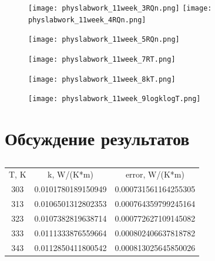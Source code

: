 \documentclass[a4paper,12pt]{article} %
\begin{document}
\begin{figure}[h!]
\begin{floatrow}
         {\texttt{[image: physlabwork\_11week\_3RQn.png]}}
         {\texttt{[image: physlabwork\_11week\_4RQn.png]}}         
\end{floatrow}
\end{figure}

\begin{figure}[h!]
\begin{floatrow}
         {\texttt{[image: physlabwork\_11week\_5RQn.png]}}     
\end{floatrow}
\end{figure}
\restoregeometry

\begin{figure}[h!]
\begin{floatrow}
 \ffigbox[\FBwidth]{\caption{}\label{fig:Graph_5}}%
         {\texttt{[image: physlabwork\_11week\_7RT.png]}}     
\end{floatrow}
\end{figure}

\begin{figure}[h!]
\begin{floatrow}
 \ffigbox[\FBwidth]{\caption{}\label{fig:Graph_5}}%
         {\texttt{[image: physlabwork\_11week\_8kT.png]}}     
\end{floatrow}
\end{figure}

\begin{figure}[h!]
\begin{floatrow}
 \ffigbox[\FBwidth]{\caption{}\label{fig:Graph_5}}%
         {\texttt{[image: physlabwork\_11week\_9logklogT.png]}}     
\end{floatrow}
\end{figure}

\section{Обсуждение результатов}
\begin{table}[H]
\caption{}
\label{tabular:timesandtenses}
\begin{center}
\begin{tabular}{ccc}
T, K & k, W/(K*m) & error, W/(K*m)\\
303 & 0.0101780189150949 & 0.000731561164255305\\
313 & 0.0106501312802353 & 0.000764359799245164\\
323 & 0.0107382819638714 & 0.000772627109145082\\
333 & 0.0111333876559664 & 0.000802406637818782\\
343 & 0.0112850411800542 & 0.000813025645850026\\
\end{tabular}
\end{center}
\end{table}
\end{document}
